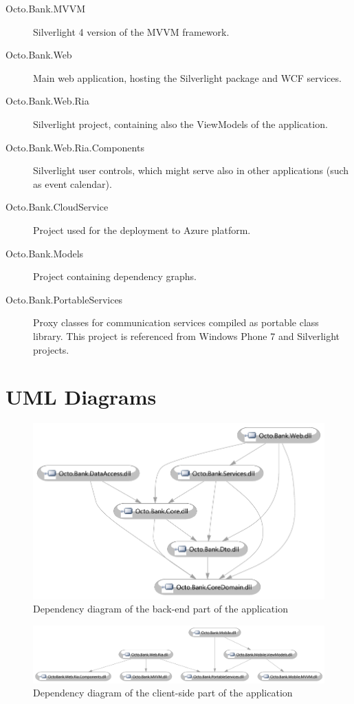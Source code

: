 \documentclass[11pt,twoside,a4paper]{book}
\begin{document}
\begin{description}
	\item [Octo.Bank.MVVM] Silverlight 4 version of the MVVM framework.
	\item [Octo.Bank.Web] Main web application, hosting the Silverlight package and WCF services.
	\item [Octo.Bank.Web.Ria] Silverlight project, containing also the ViewModels of the application.
	\item [Octo.Bank.Web.Ria.Components] Silverlight user controls, which might serve also in other applications (such as event calendar).
	\item [Octo.Bank.CloudService] Project used for the deployment to Azure platform.
	\item [Octo.Bank.Models] Project containing dependency graphs.
	\item [Octo.Bank.PortableServices] Proxy classes for communication services compiled as portable class library. This project is referenced from Windows Phone 7 and Silverlight projects.
\end{description}

\chapter{UML Diagrams}

\begin{figure}[h]
\begin{center}
\includegraphics[width=14cm]{figures/dependency_server_side}
\caption{Dependency diagram of the back-end part of the application}
\label{fig:dependency_server_side}
\end{center}
\end{figure}

\begin{figure}[h]
\begin{center}
\includegraphics[width=14cm]{figures/dependency_client_side}
\caption{Dependency diagram of the client-side part of the application}
\label{fig:dependency_client_side}
\end{center}
\end{figure}
\end{document}
